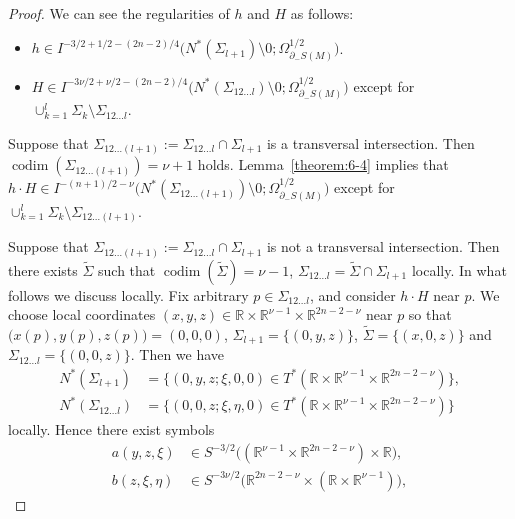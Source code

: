 \documentclass[a4paper,11pt,reqno]{amsart}
\numberwithin{equation}{section}
\theoremstyle{definition}
\theoremstyle{remark}
\begin{document}
%
%
\begin{proof}
We can see the regularities of $h$ and $H$ as follows:
%
%
\begin{itemize}
\item 
$h \in I^{-3/2+1/2-(2n-2)/4}\bigl(N^\ast(\Sigma_{l+1})\setminus0;\Omega_{\partial_-S(M)}^{1/2}\bigr)$.
\item
$H \in I^{-3\nu/2+\nu/2-(2n-2)/4}\bigl(N^\ast(\Sigma_{12\dotsc{l}})\setminus0;\Omega_{\partial_-S(M)}^{1/2}\bigr)$ 
except for $\cup_{k=1}^l\Sigma_k\setminus\Sigma_{12\dotsc{l}}$. 
\end{itemize}
%
%
\par
%
%
Suppose that $\Sigma_{12\dotsc(l+1)}:=\Sigma_{12\dotsc{l}}\cap\Sigma_{l+1}$ is a transversal intersection. 
Then $\operatorname{codim}(\Sigma_{12\dotsc(l+1)})=\nu+1$ holds. 
Lemma~\ref{theorem:6-4} implies that  
$h{\cdot}H \in  I^{-(n+1)/2-\nu}\bigl(N^\ast(\Sigma_{12\dotsc{(l+1)}})\setminus0;\Omega_{\partial_-S(M)}^{1/2}\bigr)$ 
except for  $\cup_{k=1}^l\Sigma_k\setminus\Sigma_{12\dotsc{(l+1)}}$. 
%
%
\par
%
%
Suppose that $\Sigma_{12\dotsc(l+1)}:=\Sigma_{12\dotsc{l}}\cap\Sigma_{l+1}$ is not a transversal intersection. 
Then there exists $\tilde{\Sigma}$ such that 
$\operatorname{codim}(\tilde{\Sigma})=\nu-1$, 
$\Sigma_{12\dotsc{l}}=\tilde{\Sigma}\cap\Sigma_{l+1}$ locally. 
In what follows we discuss locally.  
Fix arbitrary $p \in \Sigma_{12\dotsc{l}}$, and consider $h{\cdot}H$ near $p$. 
We choose local coordinates 
$(x,y,z) \in \mathbb{R}\times\mathbb{R}^{\nu-1}\times\mathbb{R}^{2n-2-\nu}$ 
near $p$ so that 
$\bigl(x(p),y(p),z(p)\bigr)=(0,0,0)$, 
$\Sigma_{l+1}=\{(0,y,z)\}$, $\tilde{\Sigma}=\{(x,0,z)\}$ and $\Sigma_{12\dotsc{l}}=\{(0,0,z)\}$. 
Then we have 
%
%
\begin{align*}
   N^\ast(\Sigma_{l+1})
& =
  \{(0,y,z;\xi,0,0) \in T^\ast(\mathbb{R}\times\mathbb{R}^{\nu-1}\times\mathbb{R}^{2n-2-\nu})\},
\\
   N^\ast(\Sigma_{12\dotsc{l}})
& =
  \{(0,0,z;\xi,\eta,0) \in T^\ast(\mathbb{R}\times\mathbb{R}^{\nu-1}\times\mathbb{R}^{2n-2-\nu})\}
\end{align*}
%
%
locally. Hence there exist symbols 
%
%
\begin{align*}
  a(y,z,\xi)
& \in 
  S^{-3/2}\bigl((\mathbb{R}^{\nu-1}\times\mathbb{R}^{2n-2-\nu})\times\mathbb{R}\bigr),
\\
  b(z,\xi,\eta)
& \in 
  S^{-3\nu/2}\bigl(\mathbb{R}^{2n-2-\nu}\times(\mathbb{R}\times\mathbb{R}^{\nu-1})\bigr),
\end{align*}

\end{proof}
\end{document}
